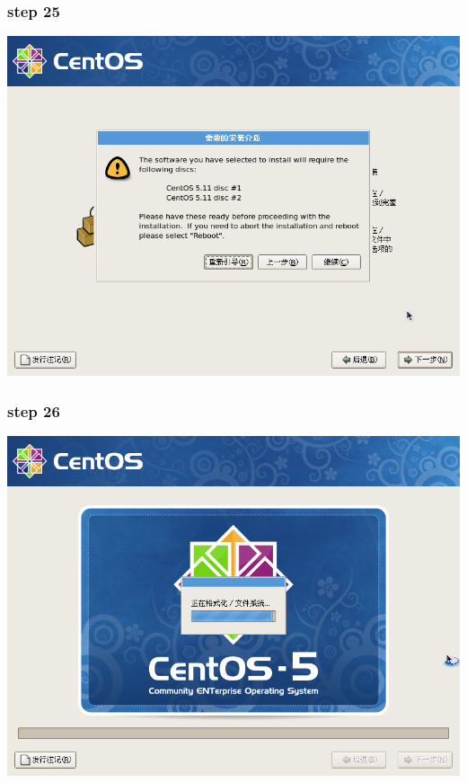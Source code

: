 \documentclass[xcolor=svgnames,presentation]{beamer}
\begin{document}
\begin{frame}
\frametitle{step 25}
\label{sec-2-25}

\begin{center}
\includegraphics[width=.9\linewidth]{img/img35.png}
\end{center}
\end{frame}
\begin{frame}
\frametitle{step 26}
\label{sec-2-26}

\begin{center}
\includegraphics[width=.9\linewidth]{img/img36.png}
\end{center}
\end{frame}
\end{document}
